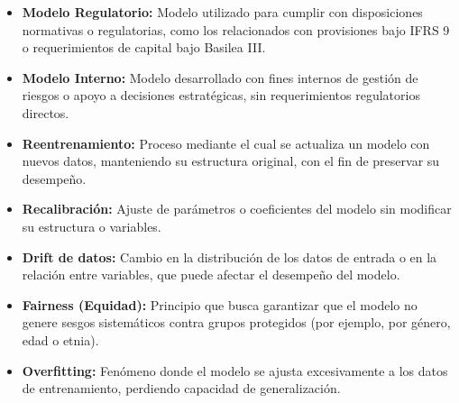 \documentclass[11pt,oneside]{article}%
\begin{document}
\begin{itemize}
\item \textbf{Modelo Regulatorio:} Modelo utilizado para cumplir con disposiciones normativas o regulatorias, como los relacionados con provisiones bajo IFRS 9 o requerimientos de capital bajo Basilea III.\\

\item \textbf{Modelo Interno:} Modelo desarrollado con fines internos de gestión de riesgos o apoyo a decisiones estratégicas, sin requerimientos regulatorios directos.\\

\item \textbf{Reentrenamiento:} Proceso mediante el cual se actualiza un modelo con nuevos datos, manteniendo su estructura original, con el fin de preservar su desempeño.\\

\item \textbf{Recalibración:} Ajuste de parámetros o coeficientes del modelo sin modificar su estructura o variables.

\item \textbf{Drift de datos:} Cambio en la distribución de los datos de entrada o en la relación entre variables, que puede afectar el desempeño del modelo.

\item \textbf{Fairness (Equidad):} Principio que busca garantizar que el modelo no genere sesgos sistemáticos contra grupos protegidos (por ejemplo, por género, edad o etnia).

\item \textbf{Overfitting:} Fenómeno donde el modelo se ajusta excesivamente a los datos de entrenamiento, perdiendo capacidad de generalización.
\end{itemize}
\end{document}
